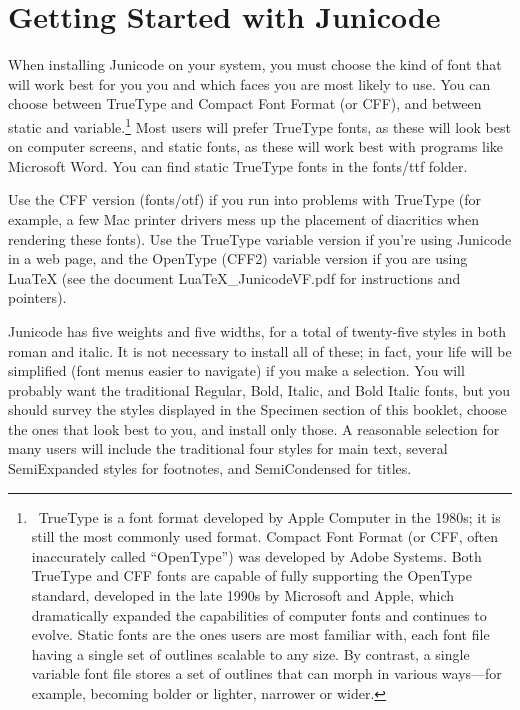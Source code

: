 \documentclass[12pt,letterpaper,openany]{book}
\newcommand{\ltech}{Lua\kern-1.5pt\TeX}
\begin{document}
\chapter*{\color{RViolet}Getting Started with Junicode}\hypertarget{GettingStarted}{}

When installing Junicode on your system, you must choose the kind of font that
will work best for you you
and which faces you are most likely to use. You can choose between TrueType
and Compact Font Format (or CFF), and between static and variable.\footnote{\ TrueType is a font format developed by
Apple Computer in the 1980s; it is still the most commonly used format. Compact Font Format
(or CFF, often inaccurately called “OpenType”) was developed by Adobe Systems.
Both TrueType and CFF fonts are capable of fully supporting the OpenType
standard, developed in the late 1990s by Microsoft and Apple, which dramatically expanded the
capabilities of computer fonts and continues to evolve. Static fonts are the ones
users are most familiar with, each font file having a single set of outlines
scalable to any size. By contrast, a single variable font file stores a set of
outlines that can morph in various ways—for example, becoming bolder or lighter,
narrower or wider.} Most users will prefer TrueType fonts, as
these will look best on computer screens, and static fonts, as these will work
best with programs like Microsoft Word. You can find static TrueType fonts in
the fonts/ttf folder.

Use the CFF version (fonts/otf) if you run into problems with TrueType (for example,
a few Mac printer drivers mess up the placement of diacritics when rendering
these fonts). Use the TrueType variable version if you're using Junicode in a
web page, and the OpenType (CFF2) variable version if you are using
{\ltech} (see the document LuaTeX\_JunicodeVF.pdf for instructions and pointers).

Junicode has five weights and five widths, for a total of twenty-five styles in
both roman and italic. It is not necessary to install all of these; in fact,
your life will be simplified (font menus easier to navigate) if you
make a selection. You will probably want the traditional Regular, Bold, Italic, and Bold
Italic fonts, but you should survey the styles displayed in the Specimen
section of this booklet, choose the ones that look best to you, and install
only those. A reasonable selection for many users will include the traditional four
styles for main text, several SemiExpanded styles for footnotes, and
SemiCondensed for titles.
\end{document}
